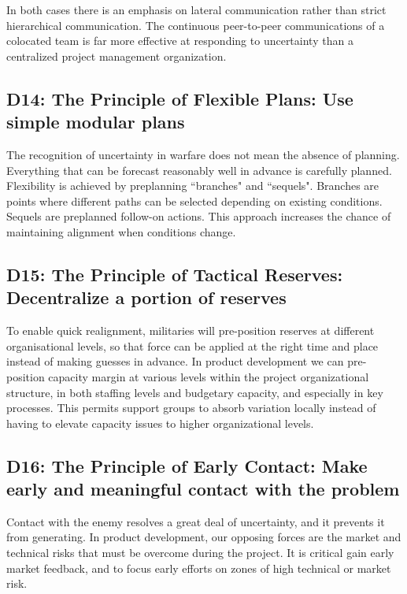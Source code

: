 \documentclass{article}
\begin{document}
\begin{multicols}{2}
In both cases there is an emphasis on lateral communication rather than strict hierarchical communication. The continuous peer-to-peer communications of a colocated team is far more effective at responding to uncertainty than a centralized project management organization.

\subsection{D14: The Principle of Flexible Plans: Use simple modular plans}

The recognition of uncertainty in warfare does not mean the absence of planning. Everything that can be forecast reasonably well in advance is carefully planned. Flexibility is achieved by preplanning ``branches" and ``sequels". Branches are points where different paths can be selected depending on existing conditions. Sequels are preplanned follow-on actions. This approach increases the chance of maintaining alignment when conditions change.

\subsection{D15: The Principle of Tactical Reserves: Decentralize a portion of reserves}

To enable quick realignment, militaries will pre-position reserves at different organisational levels, so that force can be applied at the right time and place instead of making guesses in advance. In product development we can pre-position capacity margin at various levels within the project organizational structure, in both staffing levels and budgetary capacity, and especially in key processes. This permits support groups to absorb variation locally instead of having to elevate capacity issues to higher organizational levels.

\subsection{D16: The Principle of Early Contact: Make early and meaningful contact with the problem}

Contact with the enemy resolves a great deal of uncertainty, and it prevents it from generating. In product development, our opposing forces are the market and technical risks that must be overcome during the project. It is critical gain early market feedback, and to focus early efforts on zones of high technical or market risk.

\end{multicols}
\end{document}
